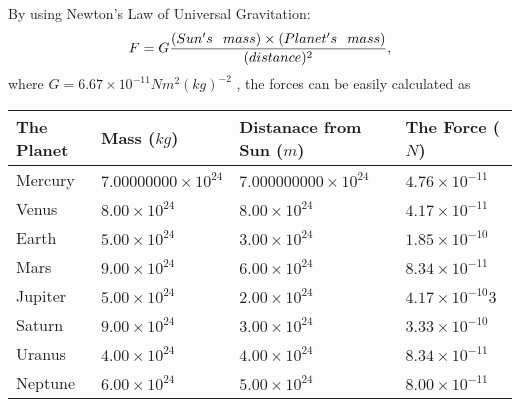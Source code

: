 \documentclass[12pt]{article}
\begin{document}
 

 
 
 
 
\noindent{}
 
 

By using Newton's Law of Universal Gravitation:
\[
F=G \frac{(Sun's \hspace{0.1in} mass) \times (Planet's \hspace{0.1in} mass)} { (distance)^2},
\]
where
$ G= %
6.67 \times 10^{-11} N m^{2}(kg)^{-2}$ , the forces can be easily calculated as
 
\vspace{0.2in}
 
 
\begin{tabular}{|l|l|l|l|}
\hline
The Planet & Mass ($kg$) & Distanace from Sun ($m$) & The Force ($N$)\\
\hline
Mercury  &
           $ %
7.00000000 \times 10^{24}  $   &
             $ %
7.000000000 \times 10^{24}$    & $ %
4.76 \times 10^{-11} $
\\  \hline
Venus    &
           $  %
8.00 \times 10^{24}  $     &
             $ %
8.00 \times 10^{24} $    & $ %
4.17 \times 10^{-11} $
\\  \hline
Earth    &
           $  %
5.00 \times 10^{24}$     &
             $ %
3.00 \times 10^{24} $    & $ %
1.85 \times 10^{-10} $
\\   \hline
Mars     &
           $  %
9.00 \times 10^{24} $     &
             $ %
6.00 \times 10^{24}$    & $ %
8.34 \times 10^{-11} $
\\   \hline
Jupiter  &
           $  %
5.00 \times 10^{24}  $    &
             $ %
2.00 \times 10^{24} $    & $ %
4.17 \times 10^{-10}3 $
\\  \hline
Saturn   &
           $  %
9.00 \times 10^{24}   $    &
             $ %
3.00 \times 10^{24}  $    & $ %
3.33 \times 10^{-10} $
\\  \hline
Uranus   &
           $  %
4.00 \times 10^{24} $    &
             $ %
4.00 \times 10^{24}$    & $ %
8.34 \times 10^{-11} $
\\  \hline
Neptune  &
           $  %
6.00 \times 10^{24}  $    &
             $ %
5.00 \times 10^{24} $    & $ %
8.00 \times 10^{-11} $
\\  \hline
 
\end{tabular}
 
 
 
 
\noindent{}
 
\end{document}
